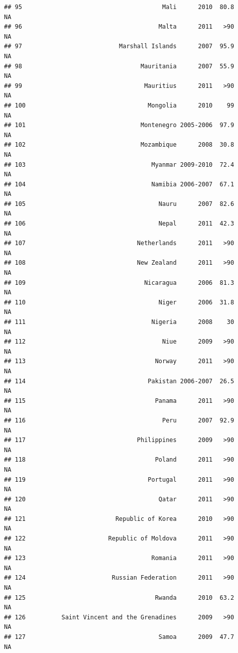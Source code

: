 \documentclass[
]{book}
\begin{document}
\begin{verbatim}
## 95                                       Mali      2010  80.8              NA
## 96                                      Malta      2011   >90              NA
## 97                           Marshall Islands      2007  95.9              NA
## 98                                 Mauritania      2007  55.9              NA
## 99                                  Mauritius      2011   >90              NA
## 100                                  Mongolia      2010    99              NA
## 101                                Montenegro 2005-2006  97.9              NA
## 102                                Mozambique      2008  30.8              NA
## 103                                   Myanmar 2009-2010  72.4              NA
## 104                                   Namibia 2006-2007  67.1              NA
## 105                                     Nauru      2007  82.6              NA
## 106                                     Nepal      2011  42.3              NA
## 107                               Netherlands      2011   >90              NA
## 108                               New Zealand      2011   >90              NA
## 109                                 Nicaragua      2006  81.3              NA
## 110                                     Niger      2006  31.8              NA
## 111                                   Nigeria      2008    30              NA
## 112                                      Niue      2009   >90              NA
## 113                                    Norway      2011   >90              NA
## 114                                  Pakistan 2006-2007  26.5              NA
## 115                                    Panama      2011   >90              NA
## 116                                      Peru      2007  92.9              NA
## 117                               Philippines      2009   >90              NA
## 118                                    Poland      2011   >90              NA
## 119                                  Portugal      2011   >90              NA
## 120                                     Qatar      2011   >90              NA
## 121                         Republic of Korea      2010   >90              NA
## 122                       Republic of Moldova      2011   >90              NA
## 123                                   Romania      2011   >90              NA
## 124                        Russian Federation      2011   >90              NA
## 125                                    Rwanda      2010  63.2              NA
## 126          Saint Vincent and the Grenadines      2009   >90              NA
## 127                                     Samoa      2009  47.7              NA

\end{verbatim}
\end{document}
